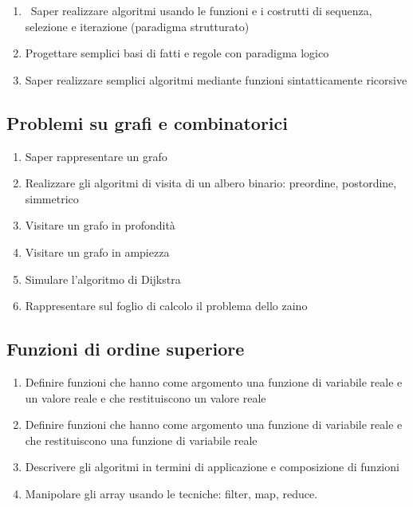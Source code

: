 \documentclass[a4paper]{easychair}
\begin{document}
\begin{enumerate}
  \item\
    Saper realizzare algoritmi usando le funzioni e 
    i costrutti di sequenza, selezione e iterazione (paradigma strutturato)
  \item
    Progettare semplici basi di fatti e regole con paradigma logico
  \item
    Saper realizzare semplici algoritmi mediante funzioni sintatticamente ricorsive
\end{enumerate}

\subsection[Grafi]{Problemi su grafi e combinatorici}

\begin{enumerate}
  \item Saper rappresentare un grafo
  \item
    Realizzare gli algoritmi di visita di un albero binario: preordine,
    postordine, simmetrico %
  \item
    Visitare un grafo in profondità
  \item
    Visitare un grafo in ampiezza
  \item
    Simulare l'algoritmo di Dijkstra
  \item Rappresentare sul foglio di calcolo il problema dello zaino
\end{enumerate}

\subsection[Funzioni di ordine superiore]{Funzioni di ordine superiore}

\begin{enumerate}
  \item
    Definire funzioni che hanno come argomento una funzione di variabile
    reale e un valore reale e che restituiscono un valore reale
  \item
    Definire funzioni che hanno come argomento una funzione di variabile
    reale e che restituiscono una funzione di variabile reale
  \item
    Descrivere gli algoritmi in termini di applicazione e composizione di funzioni
  \item
    Manipolare gli array usando le tecniche: filter, map, reduce.
\end{enumerate}
\end{document}
